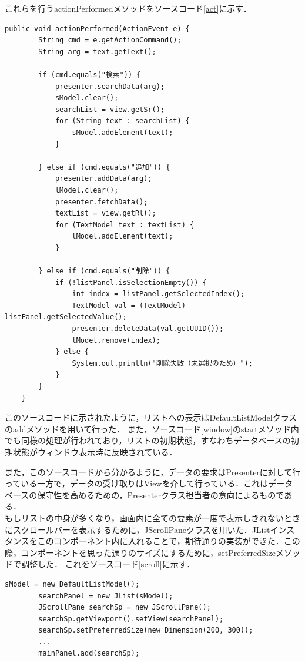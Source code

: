 \documentclass[12pt]{jarticle}
\begin{document}
これらを行うactionPerformedメソッドをソースコード\ref{act}に示す．

\begin{lstlisting}[caption=actionPerformedメソッド, label=act]
    public void actionPerformed(ActionEvent e) {
        String cmd = e.getActionCommand();
        String arg = text.getText();

        if (cmd.equals("検索")) {
            presenter.searchData(arg);
            sModel.clear();
            searchList = view.getSr();
            for (String text : searchList) {
                sModel.addElement(text);
            }

        } else if (cmd.equals("追加")) {
            presenter.addData(arg);
            lModel.clear();
            presenter.fetchData();
            textList = view.getRl();
            for (TextModel text : textList) {
                lModel.addElement(text);
            }

        } else if (cmd.equals("削除")) {
            if (!listPanel.isSelectionEmpty()) {
                int index = listPanel.getSelectedIndex();
                TextModel val = (TextModel) listPanel.getSelectedValue();
                presenter.deleteData(val.getUUID());
                lModel.remove(index);
            } else {
                System.out.println("削除失敗（未選択のため）");
            }
        }
    }
\end{lstlisting}

このソースコードに示されたように，リストへの表示はDefaultListModelクラスのaddメソッドを用いて行った．
また，ソースコード\ref{window}のstartメソッド内でも同様の処理が行われており，リストの初期状態，すなわちデータベースの初期状態がウィンドウ表示時に反映されている．

また，このソースコードから分かるように，データの要求はPresenterに対して行っている一方で，データの受け取りはViewを介して行っている．これはデータベースの保守性を高めるための，Presenterクラス担当者の意向によるものである． \\

もしリストの中身が多くなり，画面内に全ての要素が一度で表示しきれないときにスクロールバーを表示するために，JScrollPaneクラスを用いた．JListインスタンスをこのコンポーネント内に入れることで，期待通りの実装ができた．この際，コンポーネントを思った通りのサイズにするために，setPreferredSizeメソッドで調整した．
これをソースコード\ref{scroll}に示す．

\begin{lstlisting}[caption=UnifyGUIコンストラクタの一部, label=scroll]
        sModel = new DefaultListModel();
        searchPanel = new JList(sModel);
        JScrollPane searchSp = new JScrollPane();
        searchSp.getViewport().setView(searchPanel);
        searchSp.setPreferredSize(new Dimension(200, 300));
        ...
        mainPanel.add(searchSp);
\end{lstlisting}
\end{document}
